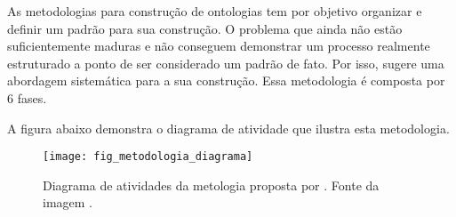 As metodologias para construção de ontologias tem por objetivo organizar e definir
um padrão para sua construção. O problema que ainda não estão suficientemente
maduras e não conseguem demonstrar um processo realmente estruturado a ponto de 
ser considerado um padrão de fato. Por isso, \cite{guizzardidesenvolvimento} 
sugere uma abordagem sistemática para a sua construção. Essa metodologia é 
composta por 6 fases.

A figura abaixo demonstra o diagrama de atividade que ilustra esta metodologia.

\begin{figure}[!h]
  \centering
  \texttt{[image: fig\_metodologia\_diagrama]} 
  \caption{Diagrama de atividades da metologia proposta por 
    \cite{guizzardidesenvolvimento}. Fonte da imagem \cite{morais2007ontologias}. 
  }
  \label{fig:diagrama_metodologia} 
\end{figure}

